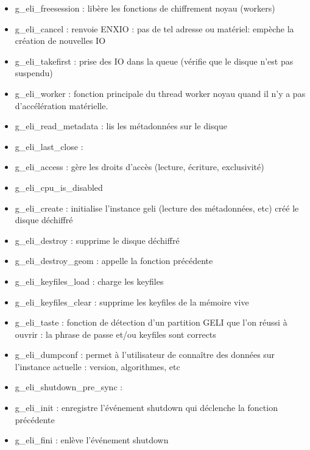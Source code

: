 \begin{itemize}
	\item g\_eli\_freesession : libère les fonctions de chiffrement noyau (workers)
	\item g\_eli\_cancel : renvoie ENXIO : pas de tel adresse ou matériel: empèche
		la création de nouvelles IO
	\item g\_eli\_takefirst : prise des IO dans la queue (vérifie que le disque n'est
		pas suspendu)
	\item g\_eli\_worker : fonction principale du thread worker noyau quand il n'y a
		pas d'accélération matérielle.
	\item g\_eli\_read\_metadata : lis les métadonnées sur le disque
	\item g\_eli\_last\_close :
	\item g\_eli\_access : gère les droits d'accès (lecture, écriture, exclusivité)
	\item g\_eli\_cpu\_is\_disabled
	\item g\_eli\_create : initialise l'instance geli (lecture des métadonnées, etc)
		créé le disque déchiffré
	\item g\_eli\_destroy : supprime le disque déchiffré
	\item g\_eli\_destroy\_geom : appelle la fonction précédente
	\item g\_eli\_keyfiles\_load : charge les keyfiles
	\item g\_eli\_keyfiles\_clear : supprime les keyfiles de la mémoire vive
	\item g\_eli\_taste : fonction de détection d'un partition GELI que l'on réussi à
		ouvrir : la phrase de passe et/ou keyfiles sont corrects
	\item g\_eli\_dumpconf : permet à l'utilisateur de connaître des données sur 
		l'instance actuelle : version, algorithmes, etc
	\item g\_eli\_shutdown\_pre\_sync : 
	\item g\_eli\_init : enregistre l'événement shutdown qui déclenche la fonction
		précédente
	\item g\_eli\_fini : enlève l'événement shutdown
\end{itemize}


